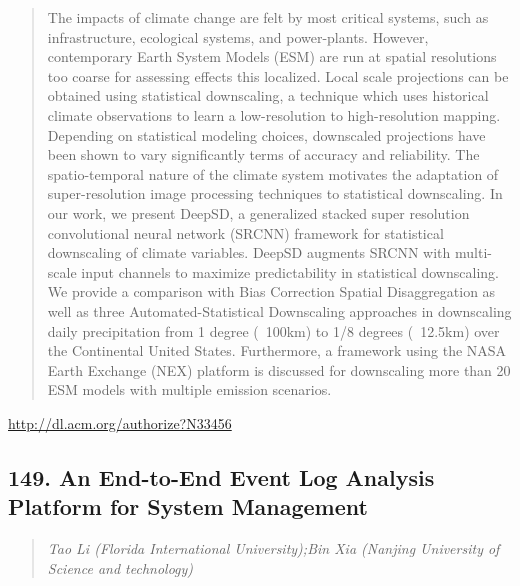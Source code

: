 \documentclass{article}
\begin{document}
\begin{quote}
The impacts of climate change are felt by most critical systems, such as infrastructure, ecological systems, and power-plants. However, contemporary Earth System Models (ESM) are run at spatial resolutions too coarse for assessing effects this localized. Local scale projections can be obtained using statistical downscaling, a technique which uses historical climate observations to learn a low-resolution to high-resolution mapping. Depending on statistical modeling choices, downscaled projections have been shown to vary significantly terms of accuracy and reliability. The spatio-temporal nature of the climate system motivates the adaptation of super-resolution image processing techniques to statistical downscaling. In our work, we present DeepSD, a generalized stacked super resolution convolutional neural network (SRCNN) framework for statistical downscaling of climate variables. DeepSD augments SRCNN with multi-scale input channels to maximize predictability in statistical downscaling. We provide a comparison with Bias Correction Spatial Disaggregation as well as three Automated-Statistical Downscaling approaches in downscaling daily precipitation from 1 degree (~100km) to 1/8 degrees (~12.5km) over the Continental United States. Furthermore, a framework using the NASA Earth Exchange (NEX) platform is discussed for downscaling more than 20 ESM models with multiple emission scenarios.
\end{quote}

\href{http://dl.acm.org/authorize?N33456}{http://dl.acm.org/authorize?N33456}

\subsection{149. An End-to-End Event Log Analysis Platform for System Management}

\begin{quote}
\footnotesize{\textit{Tao Li (Florida International University);Bin Xia (Nanjing University of Science and technology)}}

\end{quote}
\end{document}
